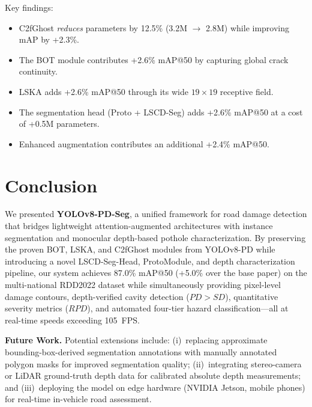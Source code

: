 \documentclass[conference]{IEEEtran}
\begin{document}
Key findings:
\begin{itemize}[leftmargin=*]
    \item C2fGhost \textit{reduces} parameters by 12.5\% (3.2M $\rightarrow$ 2.8M) while improving mAP by +2.3\%.
    \item The BOT module contributes +2.6\% mAP@50 by capturing global crack continuity.
    \item LSKA adds +2.6\% mAP@50 through its wide $19\times19$ receptive field.
    \item The segmentation head (Proto + LSCD-Seg) adds +2.6\% mAP@50 at a cost of +0.5M parameters.
    \item Enhanced augmentation contributes an additional +2.4\% mAP@50.
\end{itemize}


\section{Conclusion}
\label{sec:conclusion}

We presented \textbf{YOLOv8-PD-Seg}, a unified framework for road damage detection that bridges lightweight attention-augmented architectures with instance segmentation and monocular depth-based pothole characterization. By preserving the proven BOT, LSKA, and C2fGhost modules from YOLOv8-PD while introducing a novel LSCD-Seg-Head, ProtoModule, and depth characterization pipeline, our system achieves 87.0\% mAP@50 (+5.0\% over the base paper) on the multi-national RDD2022 dataset while simultaneously providing pixel-level damage contours, depth-verified cavity detection ($PD > SD$), quantitative severity metrics ($RPD$), and automated four-tier hazard classification---all at real-time speeds exceeding 105~FPS.

\textbf{Future Work.} Potential extensions include: (i)~replacing approximate bounding-box-derived segmentation annotations with manually annotated polygon masks for improved segmentation quality; (ii)~integrating stereo-camera or LiDAR ground-truth depth data for calibrated absolute depth measurements; and (iii)~deploying the model on edge hardware (NVIDIA Jetson, mobile phones) for real-time in-vehicle road assessment.


\end{document}
